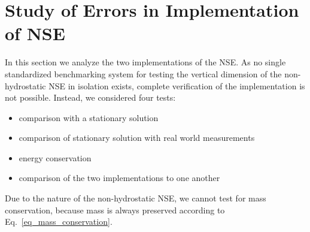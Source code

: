 





\section{Study of Errors in Implementation of NSE}
In this section we analyze the two implementations of the NSE.
As no single standardized benchmarking system for testing the vertical dimension of the non-hydrostatic NSE in isolation exists, complete verification of the implementation is not possible.
Instead, we considered four tests:
\begin{itemize}
\item comparison with a stationary solution
\item comparison of stationary solution with real world measurements
\item energy conservation
\item comparison of the two implementations to one another
\end{itemize}
Due to the nature of the non-hydrostatic NSE, we cannot test for mass conservation, because mass is always preserved according to Eq.~\ref{eq_mass_conservation}.


